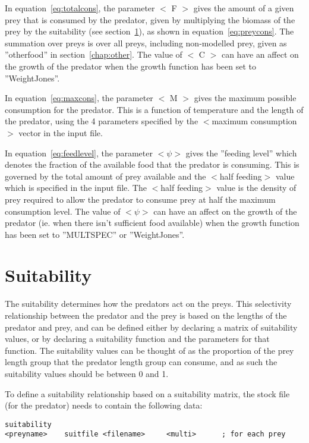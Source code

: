 \documentclass [a4paper, 10pt]{book}
\begin{document}
\bigskip
In equation~\ref{eq:totalcons}, the parameter $<$ F $>$ gives the amount of a given prey that is consumed by the predator, given by multiplying the biomass of the prey by the suitability (see section~\ref{sec:suitability}), as shown in equation~\ref{eq:preycons}.  The summation over preys is over all preys, including non-modelled prey, given as ''otherfood'' in section~\ref{chap:other}.  The value of $<$ C $>$ can have an affect on the growth of the predator when the growth function has been set to ''WeightJones''.

\bigskip
In equation~\ref{eq:maxcons}, the parameter $<$ M $>$ gives the maximum possible consumption for the predator.  This is a function of temperature and the length of the predator, using the 4 parameters specified by the $<$maximum consumption$>$ vector in the input file.

\bigskip
In equation~\ref{eq:feedlevel}, the parameter $<\psi>$ gives the ''feeding level'' which denotes the fraction of the available food that the predator is consuming.  This is governed by the total amount of prey available and the $<$half feeding$>$ value which is specified in the input file.  The $<$half feeding$>$ value is the density of prey required to allow the predator to consume prey at half the maximum consumption level.  The value of $<\psi>$ can have an affect on the growth of the predator (ie. when there isn't sufficient food available) when the growth function has been set to ''MULTSPEC'' or ''WeightJones''.

\section{Suitability}\label{sec:suitability}
The suitability determines how the predators act on the preys.  This selectivity relationship between the predator and the prey is based on the lengths of the predator and prey, and can be defined either by declaring a matrix of suitability values, or by declaring a suitability function and the parameters for that function.  The suitability values can be thought of as the proportion of the prey length group that the predator length group can consume, and as such the suitability values should be between 0 and 1.

\bigskip
To define a suitability relationship based on a suitability matrix, the stock file (for the predator) needs to contain the following data:

{\small\begin{verbatim}
suitability
<preyname>    suitfile <filename>     <multi>      ; for each prey
\end{verbatim}}
\end{document}
